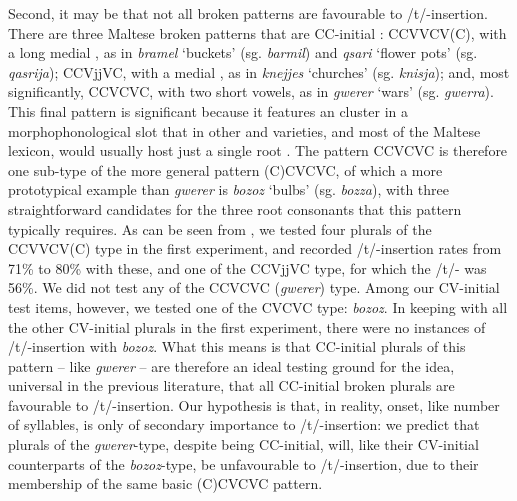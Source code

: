 \documentclass[output=paper]{langsci/langscibook}
\begin{document}
Second, it may be that not all broken  patterns are favourable to /t/-insertion. There are three Maltese broken  patterns that are CC-initial : CCVVCV(C), with a long medial , as in \textit{bramel} ‘buckets’ (sg. \textit{barmil}) and \textit{qsari} ‘flower pots’ (sg. \textit{qasrija}); CCVjjVC, with a medial  , as in \textit{knejjes} ‘churches’ (sg. \textit{knisja}); and, most significantly, CCVCVC, with two short vowels, as in \textit{gwerer} ‘wars’ (sg. \textit{gwerra}). This final pattern is significant because it features an  cluster in a morphophonological slot that in other  and  varieties, and most of the Maltese lexicon, would usually host just a single root . The pattern CCVCVC is therefore one sub-type of the more general pattern (C)CVCVC, of which a more prototypical example than \textit{gwerer} is \textit{bozoz} ‘bulbs’ (sg. \textit{bozza}), with three straightforward candidates for the three root consonants that this pattern typically requires. As can be seen from , we tested four plurals of the CCVVCV(C) type in the first experiment, and recorded /t/-insertion rates from 71\% to 80\% with these, and one of the CCVjjVC type, for which the /t/- was 56\%. We did not test any of the CCVCVC (\textit{gwerer}) type. Among our CV-initial  test items, however, we tested one  of the CVCVC type: \textit{bozoz}. In keeping with all the other CV-initial plurals in the first experiment, there were no instances of /t/-insertion with \textit{bozoz}. What this means is that CC-initial plurals of this pattern – like \textit{gwerer} – are therefore an ideal testing ground for the idea, universal in the previous literature, that all CC-initial broken plurals are favourable to /t/-insertion. Our hypothesis is that, in reality, onset, like number of syllables, is only of secondary importance to /t/-insertion: we predict that plurals of the \textit{gwerer}{}-type, despite being CC-initial, will, like their CV-initial counterparts of the \textit{bozoz}{}-type, be unfavourable to /t/-insertion, due to their membership of the same basic (C)CVCVC pattern.
\end{document}
